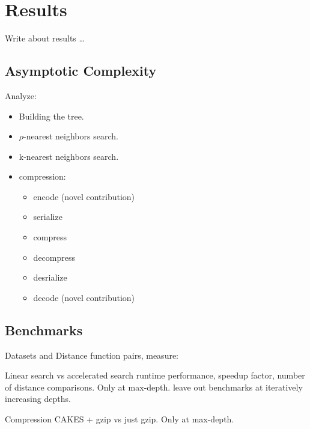 \section{Results}
\label{sec:results}

Write about results \dots

\subsection{Asymptotic Complexity}
\label{subsec:results:asymptotic-complexity}

Analyze:
\begin{itemize}
    \item Building the tree.
    \item $\rho$-nearest neighbors search.
    \item k-nearest neighbors search.
    \item compression:
    \begin{itemize}
        \item encode (novel contribution)
        \item serialize
        \item compress
        \item decompress
        \item desrialize
        \item decode (novel contribution)
    \end{itemize}
\end{itemize}


\subsection{Benchmarks}
\label{subsec:results:benchmarks}

Datasets and Distance function pairs, measure:

Linear search vs accelerated search runtime performance, speedup factor, number of distance comparisons.
Only at max-depth. leave out benchmarks at iteratively increasing depths.

Compression CAKES + gzip vs just gzip. Only at max-depth.
